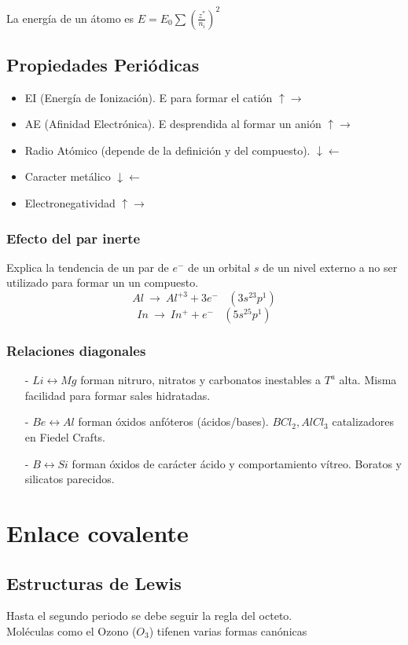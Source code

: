\documentclass[12pt]{article}
\begin{document}
La energía de un átomo es \(E= E_0\sum\displaystyle\left(\frac{z^*}{n_i}\right)^2\)
\subsection{Propiedades Periódicas}
\begin{itemize}
	\item EI (Energía de Ionización). E para formar el catión $\uparrow \rightarrow $
	\item AE (Afinidad Electrónica). E desprendida al formar un anión $\uparrow \rightarrow$
	\item Radio Atómico (depende de la definición y del compuesto). $\downarrow \leftarrow$
	\item Caracter metálico $\downarrow \leftarrow$
	\item Electronegatividad $\uparrow \rightarrow$
\end{itemize}

\subsubsection{Efecto del par inerte}
Explica la tendencia de un par de $e^-$ de un orbital $s$ de un nivel externo a no ser utilizado para formar un un compuesto.
\[Al\ \rightarrow \ Al^{+3}+3e^-\ \ \ \ (3s^23p^1)\]
\[In\ \rightarrow \ In^{+}+e^-\ \ \ \ (5s^25p^1)\]

\subsubsection{Relaciones diagonales}
\begin{itemize}
	\item[-] $Li\leftrightarrow Mg$ forman nitruro, nitratos y carbonatos inestables a $T^a$ alta. Misma facilidad para formar sales hidratadas.
	\item[-] $Be\leftrightarrow Al$ forman óxidos anfóteros (ácidos/bases). $BCl_2, AlCl_3$ catalizadores en Fiedel Crafts.
	\item[-] $B\leftrightarrow Si$ forman óxidos de carácter ácido y comportamiento vítreo. Boratos y silicatos parecidos.
\end{itemize}

\section{Enlace covalente}
\subsection{Estructuras de Lewis}
Hasta el segundo periodo se debe seguir la regla del octeto.\\
Moléculas como el Ozono ($O_3$) tifenen varias formas canónicas 
\end{document}
